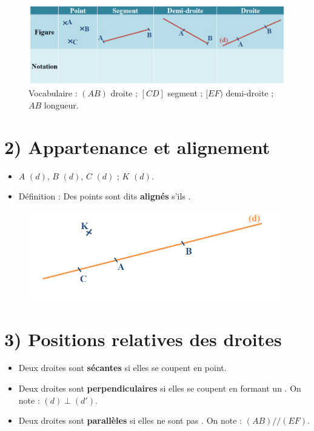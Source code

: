 \begin{figure}[h]
	\centering
	\includegraphics[width=1\linewidth]{images/images_seq_02/points_segment_droites.png}
	\caption{Vocabulaire : $(AB)$ droite ; $[CD]$ segment ; $[EF)$ demi-droite ; $AB$ longueur.}
	\label{fig:vocab-points-droites}
\end{figure}

\section*{2) Appartenance et alignement}
\begin{itemize}[label = \textbullet]
	\item $A$ \trou{1cm} $(d)$, $B$ \trou{1cm} $(d)$, $C$ \trou{1cm} $(d)$ ; $K$ \trou{1cm} $(d)$.
	\item Définition : Des points sont dits \textbf{alignés} s'ils \trou{6cm}.
\end{itemize}

\begin{figure}[h]
	\centering
	\includegraphics[width=1\linewidth]{images/images_seq_02/pt_sur_dte.png}

	\label{fig:point-sur-droite}
\end{figure}

\section*{3) Positions relatives des droites}
\begin{itemize}
	\item Deux droites sont \textbf{sécantes} si elles se coupent en \trou{1.2cm} point.
	\item Deux droites sont \textbf{perpendiculaires} si elles se coupent en formant un \trou{1.5cm} \trou{1.5cm}. On note : $(d)\perp(d')$.
	\item Deux droites sont \textbf{parallèles} si elles ne sont pas \trou{2.2cm}. On note : $(AB)//(EF)$.
\end{itemize}

